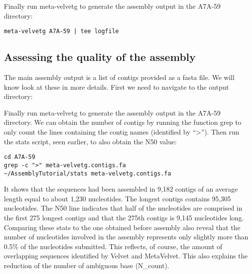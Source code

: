 \begin{steps}
Finally run meta-velvetg to generate the assembly output in the A7A-59 directory:
\begin{lstlisting}
meta-velvetg A7A-59 | tee logfile 
\end{lstlisting}
\end{steps}

\subsection{Assessing the quality of the assembly}
The main assembly output is a list of contigs provided as a fasta file. We will know look at these in more details. First we need to navigate to the output directory:

\begin{steps}
Finally run meta-velvetg to generate the assembly output in the A7A-59 directory. We can obtain the number of contigs by running the function grep to only count the lines containing the contig names (identified by “>”). Then run the stats script, seen earlier, to also obtain the N50 value:
\begin{lstlisting}
cd A7A-59
grep -c ">" meta-velvetg.contigs.fa
~/AssemblyTutorial/stats meta-velvetg.contigs.fa
\end{lstlisting}
\end{steps}

It shows that the sequences had been assembled in 9,182 contigs of an average length equal to about 1,230 nucleotides. The longest contigs contains 95,305 nucleotides. The N50 line indicates that half of the nucleotides are comprised in the first 275 longest contigs and that the 275th contigs is 9,145 nucleotides long.
Comparing these stats to the one obtained before assembly also reveal that the number of nucleotides involved in the assembly represents only slightly more than 0.5\% of the nucleotides submitted. This reflects, of course, the amount of overlapping sequences identified by Velvet and MetaVelvet. This also explains the reduction of the number of ambiguous base (N_count).


